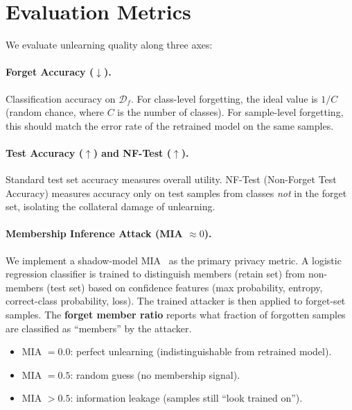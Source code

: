 \documentclass[11pt]{article}
\begin{document}
\section{Evaluation Metrics}
\label{sec:metrics}

We evaluate unlearning quality along three axes:

\paragraph{Forget Accuracy ($\downarrow$).} Classification accuracy on $\mathcal{D}_f$. For class-level forgetting, the ideal value is $1/C$ (random chance, where $C$ is the number of classes). For sample-level forgetting, this should match the error rate of the retrained model on the same samples.

\paragraph{Test Accuracy ($\uparrow$) and NF-Test ($\uparrow$).} Standard test set accuracy measures overall utility. NF-Test (Non-Forget Test Accuracy) measures accuracy only on test samples from classes \textit{not} in the forget set, isolating the collateral damage of unlearning.

\paragraph{Membership Inference Attack (MIA $\approx 0$).}
We implement a shadow-model MIA~\citep{shokri2017membership} as the primary privacy metric. A logistic regression classifier is trained to distinguish members (retain set) from non-members (test set) based on confidence features (max probability, entropy, correct-class probability, loss). The trained attacker is then applied to forget-set samples. The \textbf{forget member ratio} reports what fraction of forgotten samples are classified as ``members'' by the attacker.

\begin{itemize}[leftmargin=*]
    \item MIA $= 0.0$: perfect unlearning (indistinguishable from retrained model).
    \item MIA $= 0.5$: random guess (no membership signal).
    \item MIA $> 0.5$: information leakage (samples still ``look trained on'').
\end{itemize}
\end{document}
